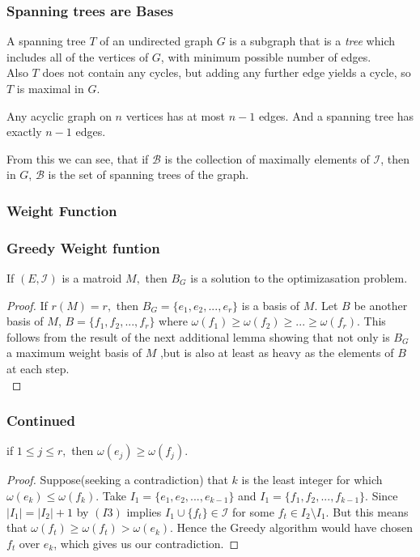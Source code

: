 \documentclass{beamer}
\begin{document}
\begin{frame}
\frametitle{Spanning trees are Bases}
\begin{definition}
A spanning tree $T$ of an undirected graph $G$ is a subgraph that is a \textit{tree} which includes all of the vertices of $G$, with minimum possible number of edges.\\
Also $T$ does not contain any cycles, but adding any further edge yields a cycle, so $T$ is maximal in $G$.\\
\end{definition}
\begin{lemma}
Any acyclic graph on $n$ vertices has at most $n-1$ edges. And a spanning tree has exactly $n-1$ edges.
\end{lemma}
From this we can see, that if $\mathcal{B}$ is the collection of maximally elements of $\mathcal{I}$, then in $G$, $\mathcal{B}$ is the set of spanning trees of the graph.
\end{frame}

\begin{frame}
\frametitle{Weight Function}
\end{frame}

\begin{frame}
\frametitle{Greedy Weight funtion}
\begin{lemma}
If $(E,\mathcal{I})$ is a matroid $M,$ then $B_G$ is a solution to the optimizasation problem.
\end{lemma}
\begin{proof}
If $r(M) = r,$ then $B_G = \{e_1,e_2, ..., e_r\}$ is a basis of $M.$ Let $B$ be another basis of $M$, $B = \{f_1, f_2, ..., f_r\}$
where $\omega(f_1) \geq \omega(f_2) \geq ... \geq \omega(f_r).$ This follows from the result of the next additional lemma showing that not only is $B_G$ a maximum weight basis of $M$ ,but is also at least as heavy as the elements of $B$ at each step.\\
\end{proof}
\end{frame}

\begin{frame}
\frametitle{Continued}
\begin{lemma}
if $1 \leq j \leq r,$ then $\omega(e_j) \geq \omega(f_j).$
\end{lemma}
\begin{proof}
Suppose(seeking a contradiction) that $k$ is the least integer for which $\omega(e_k) \leq \omega(f_k).$ Take $I_1 = \{e_1, e_2, ..., e_{k-1}\}$ and $I_1 = \{f_1, f_2, ..., f_{k-1}\}.$ Since $|I_1| = |I_2|+1$ by $(I3)$ implies $I_1 \cup \{f_t\} \in \mathcal{I}$ for some $f_t \in I_2 \setminus I_1.$ But this means that $\omega(f_t) \geq \omega(f_t) > \omega(e_k).$ Hence the Greedy algorithm would have chosen $f_t$ over $e_k$, which gives us our contradiction.
\end{proof}

\end{frame}
\end{document}
